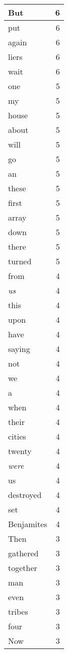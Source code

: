 \begin{center}
\begin{longtable}{l|r}
But & 6 \\ \hline
put & 6 \\ \hline
again & 6 \\ \hline
liers & 6 \\ \hline
wait & 6 \\ \hline
one & 5 \\ \hline
my & 5 \\ \hline
house & 5 \\ \hline
about & 5 \\ \hline
will & 5 \\ \hline
go & 5 \\ \hline
an & 5 \\ \hline
these & 5 \\ \hline
first & 5 \\ \hline
array & 5 \\ \hline
down & 5 \\ \hline
there & 5 \\ \hline
turned & 5 \\ \hline
from & 4 \\ \hline
\emph{us} & 4 \\ \hline
this & 4 \\ \hline
upon & 4 \\ \hline
have & 4 \\ \hline
saying & 4 \\ \hline
not & 4 \\ \hline
we & 4 \\ \hline
a & 4 \\ \hline
when & 4 \\ \hline
their & 4 \\ \hline
cities & 4 \\ \hline
twenty & 4 \\ \hline
\emph{were} & 4 \\ \hline
us & 4 \\ \hline
destroyed & 4 \\ \hline
set & 4 \\ \hline
Benjamites & 4 \\ \hline
Then & 3 \\ \hline
gathered & 3 \\ \hline
together & 3 \\ \hline
man & 3 \\ \hline
even & 3 \\ \hline
tribes & 3 \\ \hline
four & 3 \\ \hline
Now & 3 \\ \hline

\end{longtable}
\end{center}
